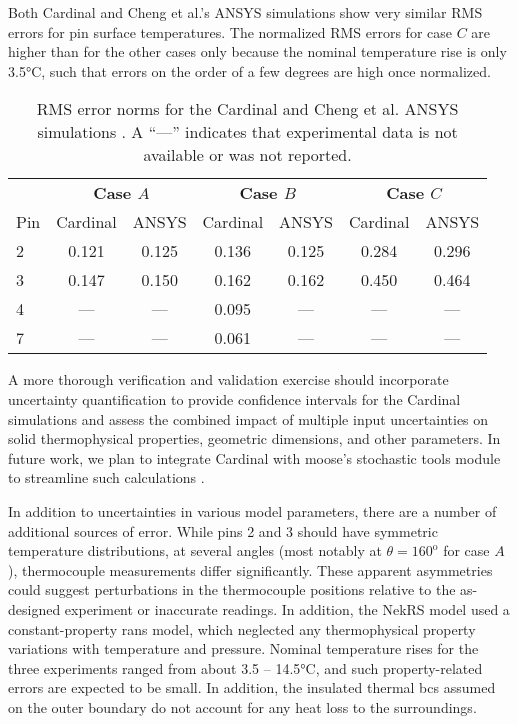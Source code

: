 \documentclass[3p,,preprint,11pt]{elsarticle}
\begin{document}
Both Cardinal and Cheng et al.'s ANSYS simulations show very similar RMS errors for pin surface temperatures. The normalized RMS errors for case $C$ are higher than for the other cases only because the nominal temperature rise is only 3.5\si{\celsius}, such that errors on the order of a few degrees are high once normalized.

\begin{table}[htb!]
\caption{RMS error norms for the Cardinal and Cheng et al. ANSYS simulations \cite{cheng2009}. A ``---'' indicates that experimental data is not available or was not reported.}
\centering
\begin{tabular}{@{}lcccccc@{}}
\toprule
 & \multicolumn{2}{c}{\bf Case $A$} & \multicolumn{2}{c}{\bf Case $B$} & \multicolumn{2}{c}{\bf Case $C$} \\
Pin & Cardinal & ANSYS & Cardinal & ANSYS & Cardinal & ANSYS\\
\midrule
2 & 0.121 & 0.125 & 0.136 & 0.125 & 0.284 & 0.296\\
3 & 0.147 & 0.150 & 0.162 & 0.162 & 0.450 & 0.464\\
4 & --- & --- & 0.095 & --- & --- & ---\\
7 & --- & --- & 0.061 & --- & --- & ---\\
\bottomrule
\end{tabular}
\label{table:global}
\end{table}

A more thorough verification and validation exercise should incorporate uncertainty quantification to provide confidence intervals for the Cardinal simulations and assess the combined impact of multiple input uncertainties on solid thermophysical properties, geometric dimensions, and other parameters. In future work, we plan to integrate Cardinal with \gls{moose}'s stochastic tools module to streamline such calculations \cite{stochastic_tools}.

In addition to uncertainties in various model parameters, there are a number of additional sources of error. While pins 2 and 3 should have symmetric temperature distributions, at several angles (most notably at $\theta=160^\text{o}$ for case $A$), thermocouple measurements differ significantly. These apparent asymmetries could suggest perturbations in the thermocouple positions relative to the as-designed experiment or inaccurate readings. In addition, the NekRS model used a constant-property \gls{rans} model, which neglected any thermophysical property variations with temperature and pressure. Nominal temperature rises for the three experiments ranged from about 3.5 -- 14.5\si{\celsius}, and such property-related errors are expected to be small. In addition, the insulated thermal \glspl{bc} assumed on the outer boundary do not account for any heat loss to the surroundings. 
\end{document}
